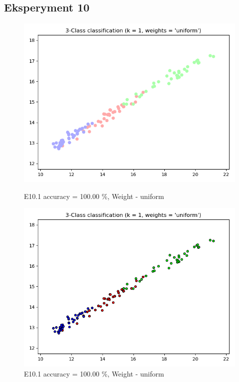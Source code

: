 \documentclass{classrep}
\begin{document}
	\subsection{Eksperyment 10}
		\begin{figure}[H]
			\begin{minipage}{0.5\linewidth}
				\centering
				\includegraphics[scale=0.25]{KNN_seed_10_1.png}
				\caption{E10.1 accuracy = 100.00 \%, Weight - uniform}
			\end{minipage}
			\begin{minipage}{0.5\linewidth}
				\centering
				\includegraphics[scale=0.25]{KNN_seed_10_2.png}
				\caption{E10.1 accuracy = 100.00 \%, Weight - uniform}
				\label{E10.1}
			\end{minipage}

\end{figure}
\end{document}
